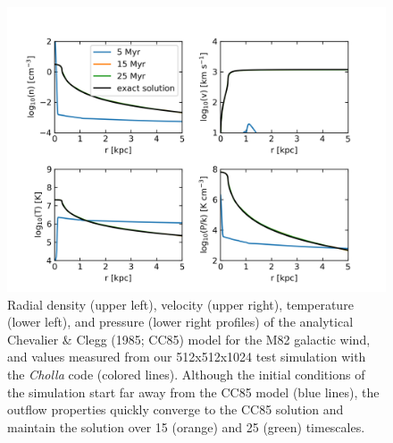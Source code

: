 \documentclass[11pt,letterpaper,english]{article}
\begin{document}
\begin{figure}[H]
\centering
\includegraphics[width=0.8\linewidth]{CC85.png}
\caption{Radial density (upper left), velocity (upper right), temperature (lower left), and pressure (lower right profiles) of the analytical Chevalier \& Clegg (1985; CC85) model for the M82 galactic wind, and values measured from our 512x512x1024 test simulation with the \textit{Cholla} code (colored lines). 
Although the initial conditions of the simulation start far away from the CC85 model (blue lines), the
outflow properties quickly converge to the CC85 solution and maintain the solution over
15 (orange) and 25 (green) timescales.}
\label{fig:CC85}
\end{figure}
\end{document}
